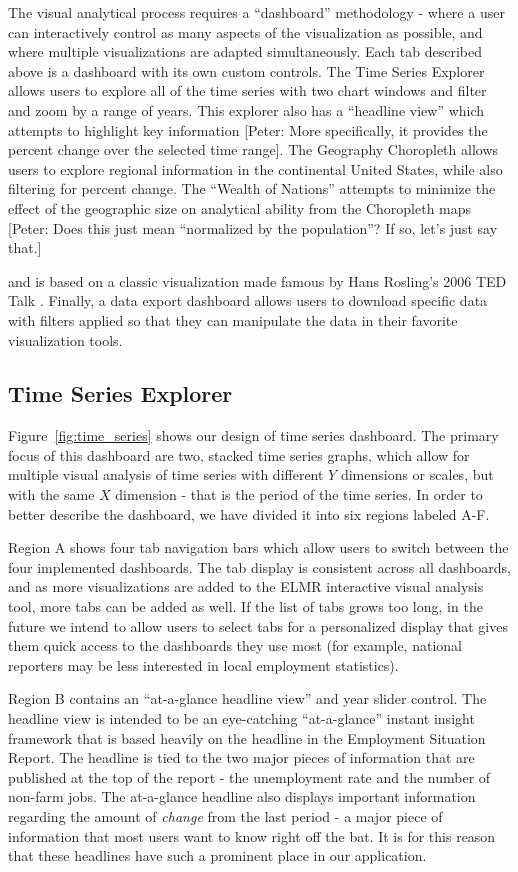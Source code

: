 \documentclass[journal]{IEEEtran}
\newcommand\Ben[1]{{\color{blue}#1}}		%
\begin{document}
{The visual analytical process requires a ``dashboard'' methodology - where a user can interactively control as many aspects of the visualization as possible, and where multiple visualizations are adapted simultaneously. Each tab described above is a dashboard with its own custom controls. The Time Series Explorer allows users to explore all of the time series with two chart windows and filter and zoom by a range of years. This explorer also has a ``headline view'' which attempts to highlight key information} [Peter: More specifically, it provides the percent change over the selected time range]. \Ben{The Geography Choropleth allows users to explore regional information in the continental United States, while also filtering for percent change. The ``Wealth of Nations'' attempts to minimize the effect of the geographic size on analytical ability from the Choropleth maps} [Peter: Does this just mean ``normalized by the population''? If so, let's just say that.] \Ben{and is based on a classic visualization made famous by Hans Rosling's 2006 TED Talk \cite{_wealth_????}. Finally, a data export dashboard allows users to download specific data with filters applied so that they can manipulate the data in their favorite visualization tools.

\subsection{Time Series Explorer}

Figure~\ref{fig:time_series} shows our design of time series dashboard. The primary focus of this dashboard are two, stacked time series graphs, which allow for multiple visual analysis of time series with different $Y$ dimensions or scales, but with the same $X$ dimension - that is the period of the time series. In order to better describe the dashboard, we have divided it into six regions labeled A-F.

Region A shows four tab navigation bars which allow users to switch between the four implemented dashboards. The tab display is consistent across all dashboards, and as more visualizations are added to the ELMR interactive visual analysis tool, more tabs can be added as well. If the list of tabs grows too long, in the future we intend to allow users to select tabs for a personalized display that gives them quick access to the dashboards they use most (for example, national reporters may be less interested in local employment statistics).

Region B contains an ``at-a-glance headline view'' and year slider control. The headline view is intended to be an eye-catching ``at-a-glance'' instant insight framework that is based heavily on the headline in the Employment Situation Report. The headline is tied to the two major pieces of information that are published at the top of the report - the unemployment rate and the number of non-farm jobs. The at-a-glance headline also displays important information regarding the amount of \textit{change} from the last period - a major piece of information that most users want to know right off the bat. It is for this reason that these headlines have such a prominent place in our application.

}
\end{document}
